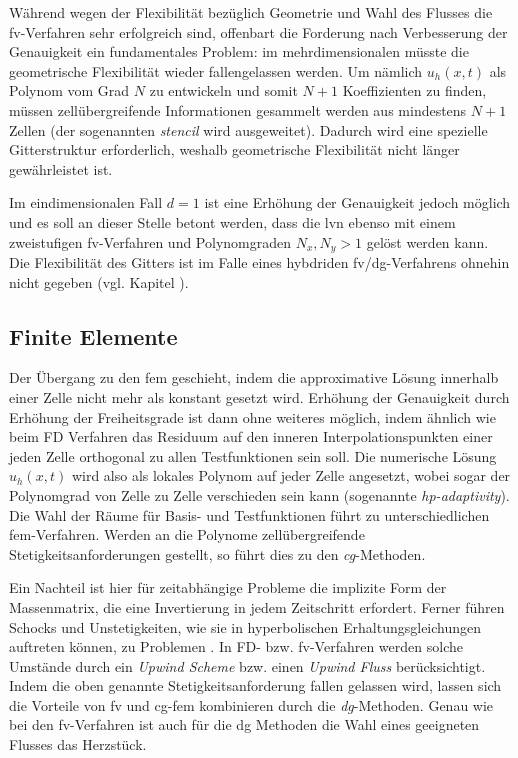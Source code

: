 Während wegen der Flexibilität bezüglich Geometrie und Wahl des Flusses die \ac{fv}-Verfahren sehr erfolgreich sind, offenbart die Forderung nach Verbesserung der Genauigkeit ein fundamentales Problem: im mehrdimensionalen müsste die geometrische Flexibilität wieder fallengelassen werden. Um nämlich $u_h(x,t)$ als Polynom vom Grad $N$ zu entwickeln und somit ${N+1}$ Koeffizienten zu finden, müssen zellübergreifende Informationen gesammelt werden aus mindestens ${N+1}$ Zellen (der sogenannten \emph{stencil} wird ausgeweitet). Dadurch wird eine spezielle Gitterstruktur erforderlich, weshalb geometrische Flexibilität nicht länger gewährleistet ist.

Im eindimensionalen Fall $d=1$ ist eine Erhöhung der Genauigkeit jedoch möglich und es soll an dieser Stelle betont werden, dass die \ac{lvn} ebenso mit einem zweistufigen \ac{fv}-Verfahren und Polynomgraden ${N_x,N_y > 1}$ gelöst werden kann. Die Flexibilität des Gitters ist im Falle eines hybdriden \ac{fv}/\ac{dg}-Verfahrens ohnehin nicht gegeben (vgl. Kapitel ).

\subsection{Finite Elemente}
Der Übergang zu den \ac{fem} geschieht, indem die approximative Lösung innerhalb einer Zelle nicht mehr als konstant gesetzt wird. Erhöhung der Genauigkeit durch Erhöhung der Freiheitsgrade ist dann ohne weiteres möglich, indem ähnlich wie beim FD Verfahren das Residuum auf den inneren Interpolationspunkten einer jeden Zelle orthogonal zu allen Testfunktionen sein soll. Die numerische Lösung $u_h(x,t)$ wird also als lokales Polynom auf jeder Zelle angesetzt, wobei sogar der Polynomgrad von Zelle zu Zelle verschieden sein kann (sogenannte \emph{hp-adaptivity}). Die Wahl der Räume für Basis- und Testfunktionen führt zu unterschiedlichen \ac{fem}-Verfahren. Werden an die Polynome zellübergreifende Stetigkeitsanforderungen gestellt, so führt dies zu den \emph{\ac{cg}}-Methoden.

Ein Nachteil ist hier für zeitabhängige Probleme die implizite Form der Massenmatrix, die eine Invertierung in jedem Zeitschritt erfordert. Ferner führen Schocks und Unstetigkeiten, wie sie in hyperbolischen Erhaltungsgleichungen auftreten können, zu Problemen \cite{dolejvsi2015discontinuous}. In FD- bzw. \ac{fv}-Verfahren werden solche Umstände durch ein \emph{Upwind Scheme} bzw. einen \emph{Upwind Fluss} berücksichtigt. Indem die oben genannte Stetigkeitsanforderung fallen gelassen wird, lassen sich die Vorteile von \ac{fv} und \ac{cg}-\ac{fem} kombinieren durch die \emph{\ac{dg}}-Methoden. Genau wie bei den \ac{fv}-Verfahren ist auch für die \ac{dg} Methoden die Wahl eines geeigneten Flusses das Herzstück.

